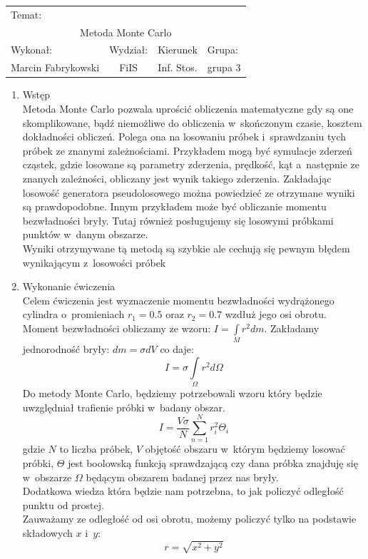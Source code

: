 \documentclass[10pt,a4paper]{article}
\begin{document}
 
\large
\begin{tabular}{|c|c|c|c|}
\hline
\multicolumn{4}{|l|}{Temat:}\\
\multicolumn{4}{|c|}{Metoda Monte Carlo}\\
\hline
\multicolumn{1}{|l}{Wykonał:}&\multicolumn{1}{|l}{Wydział:}&\multicolumn{1}{|c}{Kierunek}&\multicolumn{1}{|l|}{Grupa:}\\
Marcin Fabrykowski&FiIS&Inf. Stos.&grupa 3\\
\hline
\end{tabular}
\normalsize
\vspace{2cm}
\begin{enumerate}
\item Wstęp\\
Metoda Monte Carlo pozwala uprościć obliczenia matematyczne gdy są one skomplikowane, bądź niemożliwe do obliczenia w~skończonym czasie, kosztem dokładności obliczeń. Polega ona na losowaniu próbek i~sprawdzaniu tych próbek ze znanymi zależnościami. Przykładem mogą być symulacje zderzeń cząstek, gdzie losowane są parametry zderzenia, prędkość, kąt a~następnie ze znanych zależności, obliczany jest wynik takiego zderzenia. Zakładając losowość generatora pseudolosowego można powiedzieć ze otrzymane wyniki są prawdopodobne. Innym przykładem może być obliczanie momentu bezwładności bryły. Tutaj również posługujemy się losowymi próbkami punktów w~danym obszarze.\\
Wyniki otrzymywane tą metodą są szybkie ale cechują się pewnym błędem wynikającym z~losowości próbek
\item Wykonanie ćwiczenia\\
Celem ćwiczenia jest wyznaczenie momentu bezwładności wydrążonego cylindra o~promieniach $r_1=0.5$ oraz $r_2=0.7$ wzdłuż jego osi obrotu.\\
Moment bezwładności obliczamy ze wzoru: $I=\int\limits_Mr^2dm$. Zakładamy jednorodność bryły: $dm=\sigma dV$ co daje:
$$I=\sigma \int\limits_\Omega r^2d\Omega$$
Do metody Monte Carlo, będziemy potrzebowali wzoru który będzie uwzględniał trafienie próbki w~badany obszar.
$$I=\dfrac{V\sigma}{N}\sum\limits_{n=1}^Nr_i^2\Theta_i$$
gdzie $N$ to liczba próbek, $V$ objętość obszaru w~którym będziemy losować próbki, $\Theta$ jest boolowską funkcją sprawdzającą czy dana próbka znajduję się w~obszarze $\Omega$ będącym obszarem badanej przez nas bryły.\\
Dodatkowa wiedza która będzie nam potrzebna, to jak policzyć odległość punktu od prostej.\\
Zauważamy ze odległość od osi obrotu, możemy policzyć tylko na podstawie składowych $x$ i~$y$: $$r=\sqrt{x^2+y^2}$$

\end{enumerate}
\end{document}
